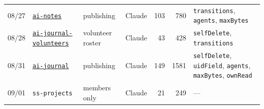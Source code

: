 \begin{table}[p]
\begin{tabular}{@{}llllrr>{\raggedright\arraybackslash}p{4.6cm}@{}}
08/27 & \href{https://mulmoserver.web.app/a/ai-notes}{\texttt{ai-notes}} & publishing & Claude & 103 & 780 & \texttt{transitions}, \texttt{agents}, \texttt{maxBytes} \\
08/28 & \href{https://mulmoserver.web.app/a/ai-journal-volunteers}{\texttt{ai-journal-volunteers}} & volunteer roster & Claude & 43 & 428 & \texttt{selfDelete}, \texttt{transitions} \\
08/31 & \href{https://mulmoserver.web.app/a/ai-journal}{\texttt{ai-journal}} & publishing & Claude & 149 & 1581 & \texttt{selfDelete}, \texttt{uidField}, \texttt{agents}, \texttt{maxBytes}, \texttt{ownRead} \\
09/01 & \texttt{ss-projects} & members only & Claude & 21 & 249 & --- \\
\bottomrule
\end{tabular}
\end{table}

